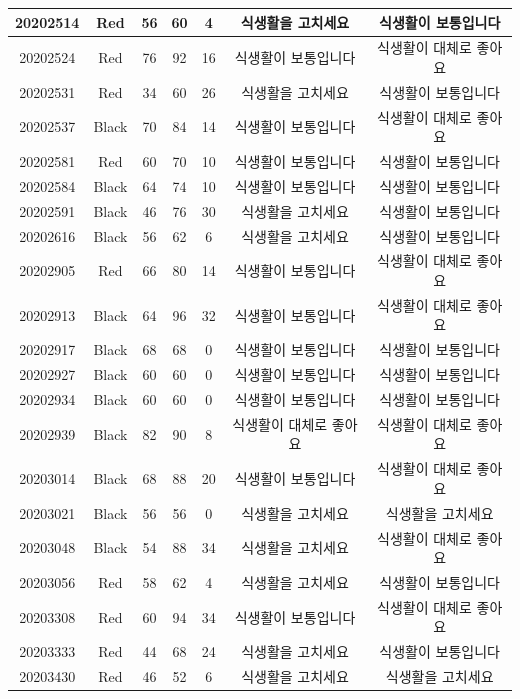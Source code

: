 \documentclass[
]{book}
\begin{document}
\begin{tabular}{c|c|c|c|c|c|c}
\hline
20202514 & Red & 56 & 60 & 4 & 식생활을 고치세요 & 식생활이 보통입니다\\
\hline
20202524 & Red & 76 & 92 & 16 & 식생활이 보통입니다 & 식생활이 대체로 좋아요\\
\hline
20202531 & Red & 34 & 60 & 26 & 식생활을 고치세요 & 식생활이 보통입니다\\
\hline
20202537 & Black & 70 & 84 & 14 & 식생활이 보통입니다 & 식생활이 대체로 좋아요\\
\hline
20202581 & Red & 60 & 70 & 10 & 식생활이 보통입니다 & 식생활이 보통입니다\\
\hline
20202584 & Black & 64 & 74 & 10 & 식생활이 보통입니다 & 식생활이 보통입니다\\
\hline
20202591 & Black & 46 & 76 & 30 & 식생활을 고치세요 & 식생활이 보통입니다\\
\hline
20202616 & Black & 56 & 62 & 6 & 식생활을 고치세요 & 식생활이 보통입니다\\
\hline
20202905 & Red & 66 & 80 & 14 & 식생활이 보통입니다 & 식생활이 대체로 좋아요\\
\hline
20202913 & Black & 64 & 96 & 32 & 식생활이 보통입니다 & 식생활이 대체로 좋아요\\
\hline
20202917 & Black & 68 & 68 & 0 & 식생활이 보통입니다 & 식생활이 보통입니다\\
\hline
20202927 & Black & 60 & 60 & 0 & 식생활이 보통입니다 & 식생활이 보통입니다\\
\hline
20202934 & Black & 60 & 60 & 0 & 식생활이 보통입니다 & 식생활이 보통입니다\\
\hline
20202939 & Black & 82 & 90 & 8 & 식생활이 대체로 좋아요 & 식생활이 대체로 좋아요\\
\hline
20203014 & Black & 68 & 88 & 20 & 식생활이 보통입니다 & 식생활이 대체로 좋아요\\
\hline
20203021 & Black & 56 & 56 & 0 & 식생활을 고치세요 & 식생활을 고치세요\\
\hline
20203048 & Black & 54 & 88 & 34 & 식생활을 고치세요 & 식생활이 대체로 좋아요\\
\hline
20203056 & Red & 58 & 62 & 4 & 식생활을 고치세요 & 식생활이 보통입니다\\
\hline
20203308 & Red & 60 & 94 & 34 & 식생활이 보통입니다 & 식생활이 대체로 좋아요\\
\hline
20203333 & Red & 44 & 68 & 24 & 식생활을 고치세요 & 식생활이 보통입니다\\
\hline
20203430 & Red & 46 & 52 & 6 & 식생활을 고치세요 & 식생활을 고치세요\\

\end{tabular}
\end{document}
